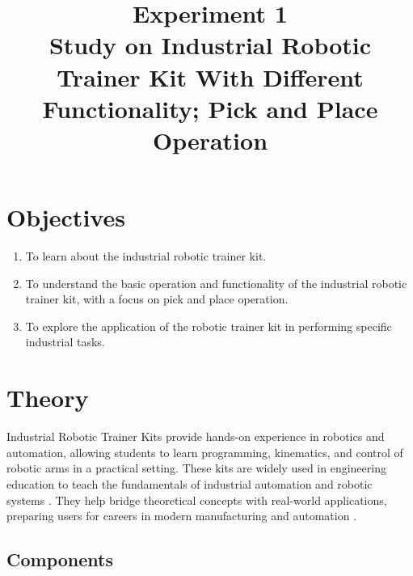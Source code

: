 \documentclass[12pt]{article}
\title{Experiment 1\\
\textbf{Study on Industrial Robotic Trainer Kit With Different Functionality; Pick and Place Operation}}
\author{}
\date{}
\begin{document}


\pagebreak

\tableofcontents

\pagebreak
{}
\maketitle

\section*{Objectives}
\begin{enumerate}
    \item To learn about the industrial robotic trainer kit.
    \item To understand the basic operation and functionality of the industrial robotic trainer kit, with a focus on pick and place operation.
    \item To explore the application of the robotic trainer kit in performing specific industrial tasks.
\end{enumerate}

\section*{Theory}
Industrial Robotic Trainer Kits provide hands-on experience in robotics and automation, allowing students to learn programming, kinematics, and control of robotic arms in a practical setting. These kits are widely used in engineering education to teach the fundamentals of industrial automation and robotic systems \cite{groover2007automation, craig2005introduction}. They help bridge theoretical concepts with real-world applications, preparing users for careers in modern manufacturing and automation \cite{siciliano2016springer}.

\subsection*{Components}
\end{document}
